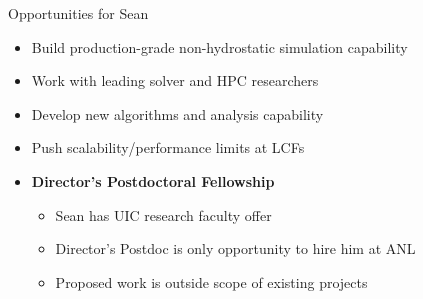 \documentclass{beamer}
\begin{document}
\begin{frame}{Opportunities for Sean}
  \begin{itemize}
  \item Build production-grade non-hydrostatic simulation capability
  \item Work with leading solver and HPC researchers
  \item Develop new algorithms and analysis capability
  \item Push scalability/performance limits at LCFs
  \item {\bf Director's Postdoctoral Fellowship}
    \begin{itemize}
    \item Sean has UIC research faculty offer
    \item Director's Postdoc is only opportunity to hire him at ANL
    \item Proposed work is outside scope of existing projects
    \end{itemize}
  \end{itemize}
\end{frame}
\end{document}
